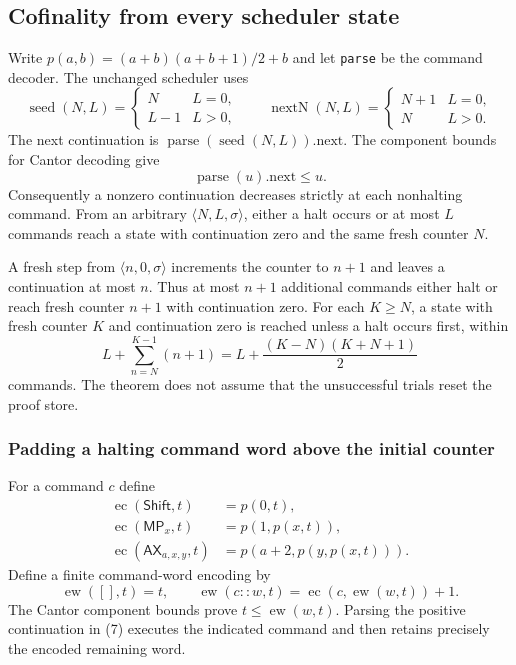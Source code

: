 \subsection{Cofinality from every scheduler state}

Write $p(a,b)=(a+b)(a+b+1)/2+b$ and let \texttt{parse} be the command
decoder. The unchanged scheduler uses
\[
 \operatorname{seed}(N,L)=
 \begin{cases}N&L=0,\\L-1&L>0,\end{cases}
 \qquad
 \operatorname{nextN}(N,L)=
 \begin{cases}N+1&L=0,\\N&L>0.\end{cases}
\tag{4}
\]
The next continuation is
$\operatorname{parse}(\operatorname{seed}(N,L)).\mathrm{next}$.
The component bounds for Cantor decoding give
\[
                 \operatorname{parse}(u).\mathrm{next}\le u.
\tag{5}
\]
Consequently a nonzero continuation decreases strictly at each
nonhalting command. From an arbitrary $\langle N,L,\sigma\rangle$,
either a halt occurs or at most $L$ commands reach a state with continuation
zero and the same fresh counter $N$.

A fresh step from $\langle n,0,\sigma\rangle$ increments the counter to
$n+1$ and leaves a continuation at most $n$. Thus at most $n+1$ additional
commands either halt or reach fresh counter $n+1$ with continuation zero.
For each $K\ge N$, a state with fresh counter $K$ and continuation zero
is reached unless a halt occurs first, within
\[
        L+\sum_{n=N}^{K-1}(n+1)
       =L+\frac{(K-N)(K+N+1)}2
\tag{6}
\]
commands. The theorem does not assume that the unsuccessful trials reset
the proof store.

\subsubsection{Padding a halting command word above the initial counter}

For a command $c$ define
\[
\begin{aligned}
 \operatorname{ec}(\mathsf{Shift},t)&=p(0,t),\\
 \operatorname{ec}(\mathsf{MP}_x,t)&=p(1,p(x,t)),\\
 \operatorname{ec}(\mathsf{AX}_{a,x,y},t)
      &=p(a+2,p(y,p(x,t))).
\end{aligned}
\]
Define a finite command-word encoding by
\[
 \operatorname{ew}([],t)=t,\qquad
 \operatorname{ew}(c::w,t)=\operatorname{ec}(c,\operatorname{ew}(w,t))+1.
\tag{7}
\]
The Cantor component bounds prove $t\le\operatorname{ew}(w,t)$.
Parsing the positive continuation in (7) executes the indicated command
and then retains precisely the encoded remaining word.

